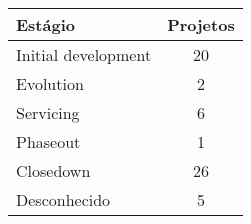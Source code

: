 \begin{tabular}{l c}
  \hline
  {\bf Estágio} & {\bf Projetos} \\
  \hline
    Initial development & 20 \\
    Evolution & 2 \\
    Servicing & 6 \\
    Phaseout & 1 \\
    Closedown & 26 \\
    Desconhecido & 5 \\
  \hline
\end{tabular}
